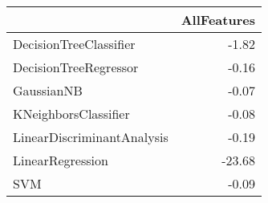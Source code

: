 \begin{tabular}{lr}
\toprule
{} &  AllFeatures \\
\midrule
DecisionTreeClassifier     &        -1.82 \\
DecisionTreeRegressor      &        -0.16 \\
GaussianNB                 &        -0.07 \\
KNeighborsClassifier       &        -0.08 \\
LinearDiscriminantAnalysis &        -0.19 \\
LinearRegression           &       -23.68 \\
SVM                        &        -0.09 \\
\bottomrule
\end{tabular}
